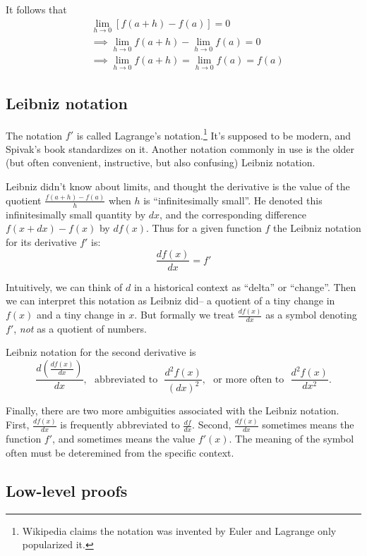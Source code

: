 It follows that
\begin{align*}
  &\lim_{h\to0}[f(a+h)-f(a)]=0\\
  &\implies \lim_{h\to0}f(a+h)-\lim_{h\to0}f(a)=0\\
  &\implies \lim_{h\to0}f(a+h)=\lim_{h\to0}f(a)=f(a)
\end{align*}

\subsection{Leibniz notation}

The notation $f'$ is called Lagrange's notation.\footnote{Wikipedia
  claims the notation was invented by Euler and Lagrange only
  popularized it.} It's supposed to be modern, and Spivak's book
standardizes on it. Another notation commonly in use is the older (but
often convenient, instructive, but also confusing) Leibniz notation.

\vs

Leibniz didn't know about limits, and thought the derivative is the
value of the quotient $\frac{f(a+h)-f(a)}{h}$ when $h$ is
``infinitesimally small''. He denoted this infinitesimally small
quantity by $dx$, and the corresponding difference $f(x+dx)-f(x)$ by
$df(x)$. Thus for a given function $f$ the Leibniz notation for its
derivative $f'$ is:
\[\frac{df(x)}{dx}=f'\]

Intuitively, we can think of $d$ in a historical context as ``delta''
or ``change''. Then we can interpret this notation as Leibniz did-- a
quotient of a tiny change in $f(x)$ and a tiny change in $x$. But
formally we treat $\frac{df(x)}{dx}$ as a symbol denoting $f'$,
\textit{not} as a quotient of numbers.

\vs

Leibniz notation for the second derivative is
\[\frac{d\left(\frac{df(x)}{dx}\right)}{dx},\ \ \ \text{abbreviated
    to}\ \ \ \frac{d^2f(x)}{(dx)^2}, \ \ \ \text{or more often to}\ \
  \ \frac{d^2f(x)}{dx^2}.\]

Finally, there are two more ambiguities associated with the Leibniz
notation. First, $\frac{df(x)}{dx}$ is frequently abbreviated to
$\frac{df}{dx}$. Second, $\frac{df(x)}{dx}$ sometimes means the
function $f'$, and sometimes means the value $f'(x)$. The meaning of
the symbol often must be deteremined from the specific context.

\subsection{Low-level proofs}

